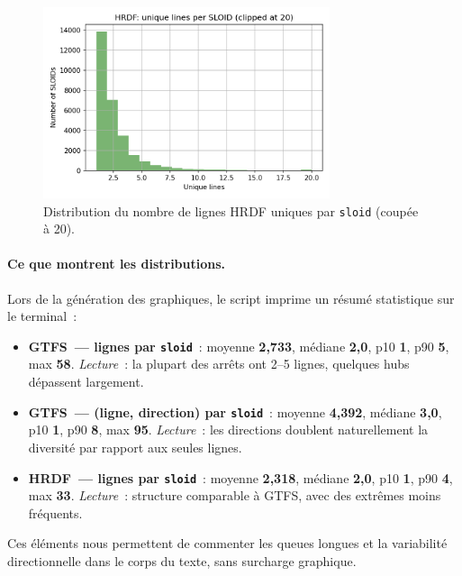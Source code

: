 \begin{figure}[H]
  \centering
  \includegraphics[width=0.75\textwidth]{../figures/chap4/hist_hrdf_lines_per_sloid.png}
  \caption{Distribution du nombre de lignes HRDF uniques par \texttt{sloid} (coupée à 20).}
\end{figure}

\paragraph{Ce que montrent les distributions.} Lors de la génération des graphiques, le script imprime un résumé statistique sur le terminal :
\begin{itemize}
  \item \textbf{GTFS — lignes par \texttt{sloid}} : moyenne \textbf{2,733}, médiane \textbf{2,0}, p10 \textbf{1}, p90 \textbf{5}, max \textbf{58}. \emph{Lecture} : la plupart des arrêts ont 2–5 lignes, quelques hubs dépassent largement.
  \item \textbf{GTFS — (ligne, direction) par \texttt{sloid}} : moyenne \textbf{4,392}, médiane \textbf{3,0}, p10 \textbf{1}, p90 \textbf{8}, max \textbf{95}. \emph{Lecture} : les directions doublent naturellement la diversité par rapport aux seules lignes.
  \item \textbf{HRDF — lignes par \texttt{sloid}} : moyenne \textbf{2,318}, médiane \textbf{2,0}, p10 \textbf{1}, p90 \textbf{4}, max \textbf{33}. \emph{Lecture} : structure comparable à GTFS, avec des extrêmes moins fréquents.
\end{itemize}
Ces éléments nous permettent de commenter les queues longues et la variabilité directionnelle dans le corps du texte, sans surcharge graphique.

